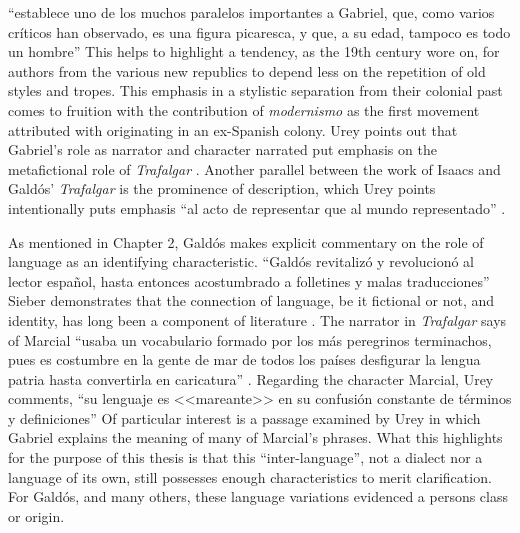 \documentclass[12pt]{report}
\begin{document}
\enquote{establece uno de los muchos paralelos importantes a Gabriel, que, como varios críticos han observado, es una figura picaresca, y que, a su edad, tampoco es todo un hombre} \cite[1526]{Urey1992}
This helps to highlight a tendency, as the 19th century wore on, for authors from the various new republics to depend less on the repetition of old styles and tropes.
This emphasis in a stylistic separation from their colonial past comes to fruition with the contribution of \textit{modernismo} as the first movement attributed with originating in an ex-Spanish colony.
Urey points out that Gabriel's role as narrator and character narrated put emphasis on the metafictional role of \textit{Trafalgar} \cite[1526]{Urey1992}.
Another parallel between the work of Isaacs and Galdós' \textit{Trafalgar} is the prominence of description, which Urey points intentionally puts emphasis \enquote{al acto de representar que al mundo representado} \cite[1527]{Urey1992}.


As mentioned in Chapter 2, Galdós makes explicit commentary on the role of language as an identifying characteristic.
\enquote{Galdós revitalizó y revolucionó al lector español, hasta entonces acostumbrado a folletines y malas traducciones} \cite[1525]{Urey1992}
Sieber demonstrates that the connection of language, be it fictional or not, and identity, has long been a component of literature \autocite*[98]{Sieber1978}.
The narrator in \textit{Trafalgar} says of Marcial \enquote{usaba un vocabulario formado por los más peregrinos terminachos, pues es costumbre en la gente de mar de todos los países desfigurar la lengua patria hasta convertirla en caricatura} \cite[21]{Galdos1882}.
Regarding the character Marcial, Urey comments, \enquote{su lenguaje es <<mareante>> en su confusión constante de términos y definiciones} \autocite*[1526]{Urey1992}
Of particular interest is a passage examined by Urey in which Gabriel explains the meaning of many of Marcial's phrases.
What this highlights for the purpose of this thesis is that this \enquote{inter-language}, not a dialect nor a language of its own, still possesses enough characteristics to merit clarification.
For Galdós, and many others, these language variations evidenced a persons class or origin.
\end{document}
